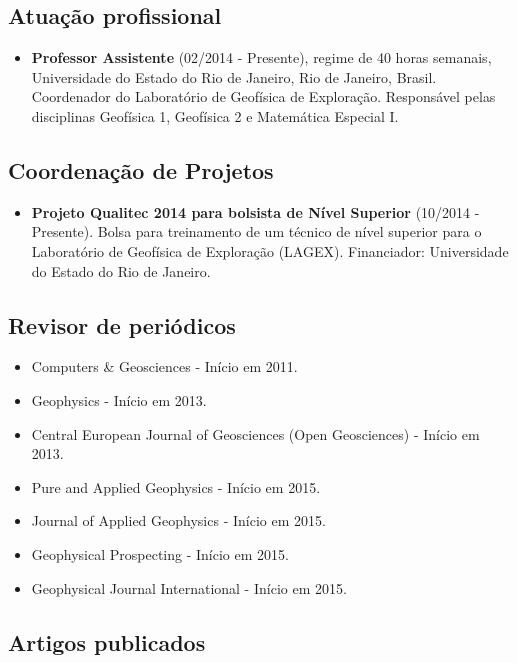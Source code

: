 \documentclass[12pt,a4paper,oneside,titlepage,onecolumn]{article}
\begin{document}
\subsection{Atuação profissional}

\begin{itemize}
    \item \textbf{Professor Assistente} (02/2014 - Presente), regime de 40
        horas semanais,
        Universidade do Estado do Rio de Janeiro, Rio de Janeiro, Brasil.
        Coordenador do Laboratório de Geofísica de Exploração. Responsável
        pelas disciplinas Geofísica 1, Geofísica 2 e Matemática Especial I.
\end{itemize}


\subsection{Coordenação de Projetos}

\begin{itemize}
    \item \textbf{Projeto Qualitec 2014 para bolsista de Nível Superior}
        (10/2014 - Presente).
        Bolsa para treinamento de um técnico de nível superior para o
        Laboratório de Geofísica de Exploração (LAGEX).
        Financiador: Universidade do Estado do Rio de Janeiro.
\end{itemize}


\subsection{Revisor de periódicos}

\begin{itemize}
    \item Computers \& Geosciences - Início em 2011.
    \item Geophysics - Início em 2013.
    \item Central European Journal of Geosciences (Open Geosciences) - Início em 2013.
    \item Pure and Applied Geophysics - Início em 2015.
    \item Journal of Applied Geophysics - Início em 2015.
    \item Geophysical Prospecting - Início em 2015.
    \item Geophysical Journal International - Início em 2015.
\end{itemize}

\subsection{Artigos publicados}
\end{document}
